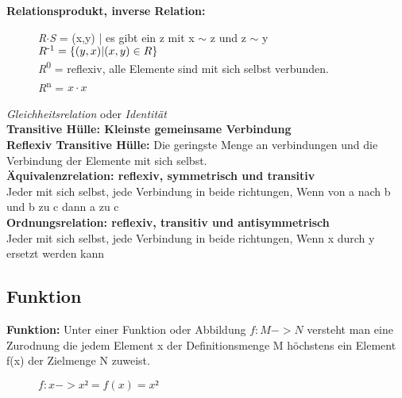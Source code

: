 \textbf{Relationsprodukt, inverse Relation:}  \\

\begin{figure}[H]
\centering
\textit{R}$\cdot$\textit{S} = (x,y) | es gibt ein z mit x $\sim$ z und z $\sim$ y\\
$R\textsuperscript{-1} =  \{ (y,x)|(x,y) \in R \}$ \\
\textit{R}\textsuperscript{0} = reflexiv, alle Elemente sind mit sich selbst verbunden.\\
\textit{R}\textsuperscript{n} = $x \cdot x$\\

\end{figure}





\textit{Gleichheitsrelation} oder \textit{Identität}\\

\textbf{Transitive Hülle: Kleinste gemeinsame Verbindung}\\

\textbf{Reflexiv Transitive Hülle:} Die geringste Menge an verbindungen und die Verbindung der Elemente mit sich selbst.\\

\textbf{Äquivalenzrelation: reflexiv, symmetrisch und transitiv}\\
Jeder mit sich selbst, jede Verbindung in beide richtungen, Wenn von a nach b und b zu c dann a zu c\\

\textbf{Ordnungsrelation: reflexiv, transitiv und antisymmetrisch} \\
Jeder mit sich selbst, jede Verbindung in beide richtungen, Wenn x durch y ersetzt werden kann \\





\subsection{Funktion}

\textbf{Funktion:} Unter einer Funktion oder Abbildung $f: M -> N$ versteht man eine Zurodnung die jedem Element x der Definitionsmenge M höchstens ein Element f(x) der Zielmenge N zuweist.

\begin{figure}
\centering
$f: x -> x² = f(x) = x²$
\end{figure}

